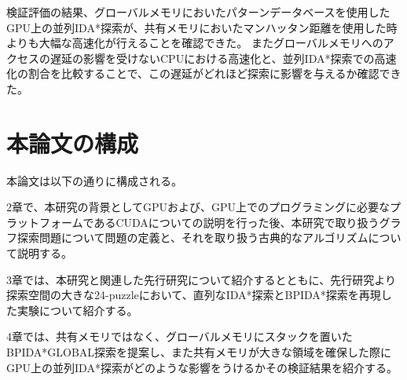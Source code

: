 \documentclass[a4paper,11pt,oneside,openany]{jsbook}
\begin{document}
検証評価の結果、グローバルメモリにおいたパターンデータベースを使用したGPU上の並列IDA*探索が、共有メモリにおいたマンハッタン距離を使用した時よりも大幅な高速化が行えることを確認できた。
またグローバルメモリへのアクセスの遅延の影響を受けないCPUにおける高速化と、並列IDA*探索での高速化の割合を比較することで、この遅延がどれほど探索に影響を与えるか確認できた。






\section{本論文の構成}
本論文は以下の通りに構成される。

2章で、本研究の背景としてGPUおよび、GPU上でのプログラミングに必要なプラットフォームであるCUDAについての説明を行った後、本研究で取り扱うグラフ探索問題について問題の定義と、それを取り扱う古典的なアルゴリズムについて説明する。

3章では、本研究と関連した先行研究について紹介するとともに、先行研究より探索空間の大きな24-puzzleにおいて、直列なIDA*探索とBPIDA*探索を再現した実験について紹介する。

4章では、共有メモリではなく、グローバルメモリにスタックを置いたBPIDA*GLOBAL探索を提案し、また共有メモリが大きな領域を確保した際にGPU上の並列IDA*探索がどのような影響をうけるかその検証結果を紹介する。
\end{document}
